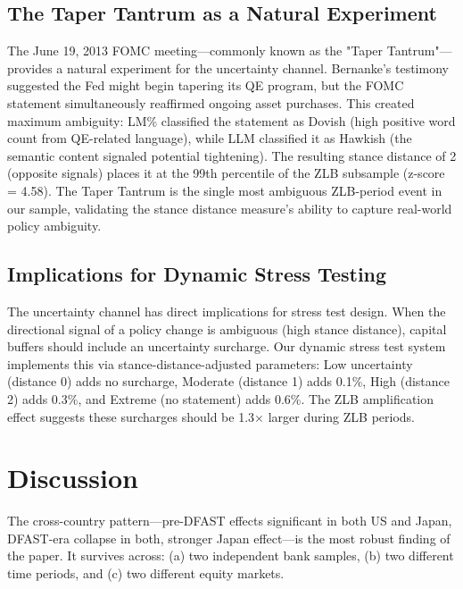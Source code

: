 \documentclass[12pt,a4paper]{article}
\begin{document}
\subsection{The Taper Tantrum as a Natural Experiment}

The June 19, 2013 FOMC meeting—commonly known as the "Taper Tantrum"—provides a natural experiment for the uncertainty channel. Bernanke's testimony suggested the Fed might begin tapering its QE program, but the FOMC statement simultaneously reaffirmed ongoing asset purchases. This created maximum ambiguity: LM\% classified the statement as Dovish (high positive word count from QE-related language), while LLM classified it as Hawkish (the semantic content signaled potential tightening). The resulting stance distance of 2 (opposite signals) places it at the 99th percentile of the ZLB subsample (z-score = 4.58). The Taper Tantrum is the single most ambiguous ZLB-period event in our sample, validating the stance distance measure's ability to capture real-world policy ambiguity.

\subsection{Implications for Dynamic Stress Testing}

The uncertainty channel has direct implications for stress test design. When the directional signal of a policy change is ambiguous (high stance distance), capital buffers should include an uncertainty surcharge. Our dynamic stress test system implements this via stance-distance-adjusted parameters: Low uncertainty (distance 0) adds no surcharge, Moderate (distance 1) adds 0.1\%, High (distance 2) adds 0.3\%, and Extreme (no statement) adds 0.6\%. The ZLB amplification effect suggests these surcharges should be 1.3$\times$  larger during ZLB periods.

\section{Discussion}

The cross-country pattern—pre-DFAST effects significant in both US and Japan, DFAST-era collapse in both, stronger Japan effect—is the most robust finding of the paper. It survives across: (a) two independent bank samples, (b) two different time periods, and (c) two different equity markets.
\end{document}
